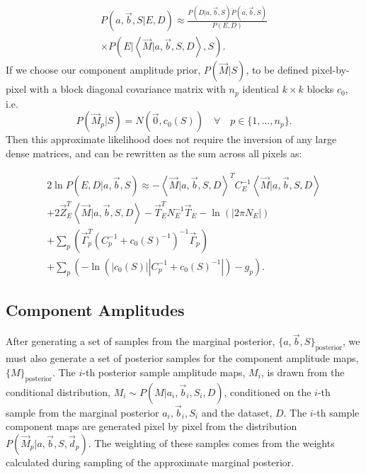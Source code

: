 \documentclass[fleqn,usenatbib]{mnras}
\begin{document}
\begin{multline}\label{approximatedion}
    P(a,\Vec{b},S|E,D) \approx\frac{P(D|a,\Vec{b},S)P(a,\Vec{b},S)}{P(E,D)} \\ \times P(E|\left<\Vec{M}|a,\Vec{b},S,D\right>,S).
\end{multline}
If we choose our component amplitude prior, $P(\Vec{M}|S)$, to be defined pixel-by-pixel with a block diagonal covariance matrix with $n_p$ identical $k\times k$ blocks $c_0$, i.e. 
\begin{equation}
    P(\Vec{M}_p|S)=N(\Vec{0},c_0(S)) \quad \forall \quad p \in \{1,\ldots,n_p\}.
\end{equation}
Then this approximate likelihood does not require the inversion of any large dense matrices, and can be rewritten as the sum across all pixels as:

\begin{multline}
\label{approximation logL}
    2\ln{P(E,D| a,\Vec{b},S)} \approx -\left<\Vec{M}|a,\Vec{b},S,D\right>^T C_E^{-1} \left<\Vec{M}|a,\Vec{b},S,D\right> \\+ 2\Vec{Z}_E^T \left<\Vec{M}|a,\Vec{b},S,D\right> - \Vec{T}_E^T N_E^{-1}\Vec{T}_E - \ln(|2\pi N_E|) \\+\sum_p \left( \Vec{\Gamma}_p^T\left(C_p^{-1} + c_0(S)^{-1}\right)^{-1}\Vec{\Gamma}_p\right) \\+\sum_p \left(-\ln\left(\left|c_0(S)\right|\left|C_p^{-1} + c_0(S)^{-1}\right|\right) - g_p \right).
\end{multline}


\subsection{Component Amplitudes}
After generating a set of samples from the marginal posterior, $\{a,\Vec{b},S\}_\mathrm{posterior}$, we must also generate a set of posterior samples for the component amplitude maps, $\{M\}_\mathrm{posterior}$. The $i$-th posterior sample amplitude maps, $M_i$, is drawn from the conditional distribution, $M_i \sim P(M|a_i,\Vec{b}_i,S_i,D)$, conditioned on the $i$-th sample from the marginal posterior $a_i,\Vec{b}_i,S_i$ and the dataset, $D$. The $i$-th sample component maps are generated pixel by pixel from the distribution $P(\Vec{M}_p|a,\Vec{b},S,\Vec{d}_p)$.
The weighting of these samples comes from the weights calculated during sampling of the approximate marginal posterior.
\end{document}
